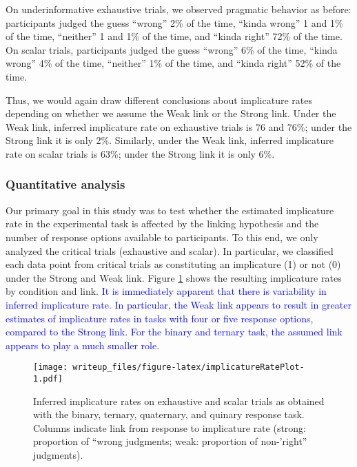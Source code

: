 \documentclass[man]{apa6}
\newcommand{\change}[1]{\textcolor{Blue}{#1}}
\theoremstyle{definition}
\theoremstyle{definition}
\theoremstyle{definition}
\theoremstyle{remark}
\begin{document}
On underinformative exhaustive trials, we observed pragmatic behavior as
before: participants judged the guess \enquote{wrong} 2\% of the time,
\enquote{kinda wrong} 1 and 1\% of the time, \enquote{neither} 1 and 1\%
of the time, and \enquote{kinda right} 72\% of the time. On scalar
trials, participants judged the guess \enquote{wrong} 6\% of the time,
\enquote{kinda wrong} 4\% of the time, \enquote{neither} 1\% of the
time, and \enquote{kinda right} 52\% of the time.

Thus, we would again draw different conclusions about implicature rates
depending on whether we assume the Weak link or the Strong link. Under
the Weak link, inferred implicature rate on exhaustive trials is 76 and
76\%; under the Strong link it is only 2\%. Similarly, under the Weak
link, inferred implicature rate on scalar trials is 63\%; under the
Strong link it is only 6\%.

\subsubsection{Quantitative analysis}\label{quantitative-analysis}

Our primary goal in this study was to test whether the estimated
implicature rate in the experimental task is affected by the linking
hypothesis and the number of response options available to participants.
To this end, we only analyzed the critical trials (exhaustive and
scalar). In particular, we classified each data point from critical
trials as constituting an implicature (1) or not (0) under the Strong
and Weak link. Figure \ref{fig:implicatureRatePlot} shows the resulting
implicature rates by condition and link. \change{It is immediately apparent that there is variability in inferred implicature rate. In particular, the Weak link appears to result in greater estimates of
implicature rates in tasks with four or five response options, compared to the Strong link. For the binary and ternary task, the assumed link appears to play a much smaller role.}

\begin{figure}
\centering
\texttt{[image: writeup\_files/figure-latex/implicatureRatePlot-1.pdf]}
\caption{\label{fig:implicatureRatePlot}Inferred implicature rates on
exhaustive and scalar trials as obtained with the binary, ternary,
quaternary, and quinary response task. Columns indicate link from
response to implicature rate (strong: proportion of \enquote{wrong
judgments; weak: proportion of non-'right} judgments).}
\end{figure}
\end{document}
